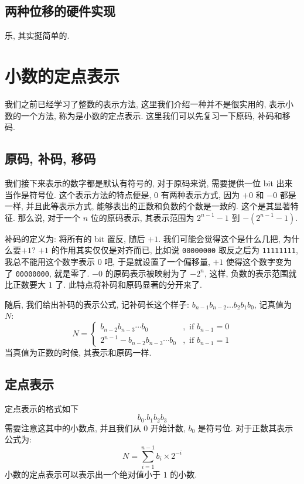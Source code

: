 \documentclass[12pt]{ctexart}
\theoremstyle{definition}
\theoremstyle{plain}
\begin{document}
\subsection{两种位移的硬件实现}
乐, 其实挺简单的. 

\section{小数的定点表示}\label{sec:ding}
我们之前已经学习了整数的表示方法, 这里我们介绍一种并不是很实用的, 表示小数的一个方法, 称为是小数的定点表示. 这里我们可以先复习一下原码, 补码和移码. 
\subsection{原码, 补码, 移码}
我们接下来表示的数字都是默认有符号的, 对于原码来说, 需要提供一位 bit 出来当作是符号位. 这个表示方法的特点便是, \(0\) 有两种表示方式, 因为 \(+0\) 和 \(-0\) 都是一样, 并且此等表示方式, 能够表出的正数和负数的个数是一致的. 这个是其显著特征. 
那么说, 对于一个 \(n\) 位的原码表示, 其表示范围为 \(2^{n-1} - 1\) 到 \(-(2 ^{n-1} - 1)\).

补码的定义为: 将所有的 bit 置反, 随后 \(+1\). 我们可能会觉得这个是什么几把, 为什么要\(+1\)? \(+1\) 的作用其实仅仅是对齐而已, 比如说 \texttt{00000000} 取反之后为 \texttt{11111111}, 我总不能用这个数字表示 \(0\) 吧, 于是就设置了一个偏移量, \(+1\) 使得这个数字变为了 \texttt{00000000}, 就是零了. \(-0\) 的原码表示被映射为了 \(-2 ^{n}\), 这样, 负数的表示范围就比正数要大 \(1\) 了. 此特点将补码和原码显著的分开来了. 

随后, 我们给出补码的表示公式, 记补码长这个样子: \(b_{n-1}b_{n-2}\dots b_{2}b_{1}b_{0}\), 记真值为 \(N\): 
\begin{equation}
N = 
\begin{cases}
b_{n-2}b_{n-3}\cdots b_{0} &, \text{ if } b_{n-1} = 0\\
2 ^{n-1} - b _{n-2} b_{n-3} \cdots b_{0} &, \text{ if } b_{n-1} = 1
\end{cases}
\end{equation}
当真值为正数的时候, 其表示和原码一样. 
\subsection{定点表示}
定点表示的格式如下 
\begin{equation}
	b_{0}.b_{1}b_{2}b_{3}
\end{equation}
需要注意这其中的小数点, 并且我们从 \(0\) 开始计数, \(b_{0}\) 是符号位. 对于正数其表示公式为: 
\begin{equation}
	N = \sum_{i = 1 } ^{n-1} b_{i} \times 2^{-i}
\end{equation}
小数的定点表示可以表示出一个绝对值小于 \(1\) 的小数. 
\end{document}
